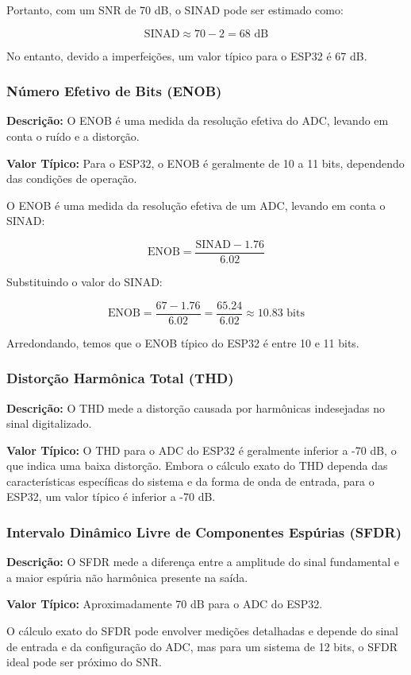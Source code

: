 Portanto, com um SNR de 70 dB, o SINAD pode ser estimado como:

\[
\text{SINAD} \approx 70 - 2 = 68 \text{ dB}
\]

No entanto, devido a imperfeições, um valor típico para o ESP32 é 67 dB.

\subsubsection{Número Efetivo de Bits (ENOB)}
\textbf{Descrição:} O ENOB é uma medida da resolução efetiva do ADC, levando em conta o ruído e a distorção.

\textbf{Valor Típico:} Para o ESP32, o ENOB é geralmente de 10 a 11 bits, dependendo das condições de operação.

O ENOB é uma medida da resolução efetiva de um ADC, levando em conta o SINAD:

\[
\text{ENOB} = \frac{\text{SINAD} - 1.76}{6.02}
\]

Substituindo o valor do SINAD:

\[
\text{ENOB} = \frac{67 - 1.76}{6.02} = \frac{65.24}{6.02} \approx 10.83 \text{ bits}
\]

Arredondando, temos que o ENOB típico do ESP32 é entre 10 e 11 bits.

\subsubsection{Distorção Harmônica Total (THD)}
\textbf{Descrição:} O THD mede a distorção causada por harmônicas indesejadas no sinal digitalizado.

\textbf{Valor Típico:} O THD para o ADC do ESP32 é geralmente inferior a -70 dB, o que indica uma baixa distorção.
Embora o cálculo exato do THD dependa das características específicas do sistema e da forma de onda de entrada, para o ESP32, um valor típico é inferior a -70 dB.

\subsubsection{Intervalo Dinâmico Livre de Componentes Espúrias (SFDR)}
\textbf{Descrição:} O SFDR mede a diferença entre a amplitude do sinal fundamental e a maior espúria não harmônica presente na saída.

\textbf{Valor Típico:} Aproximadamente 70 dB para o ADC do ESP32.

O cálculo exato do SFDR pode envolver medições detalhadas e depende do sinal de entrada e da configuração do ADC, mas para um sistema de 12 bits, o SFDR ideal pode ser próximo do SNR.

